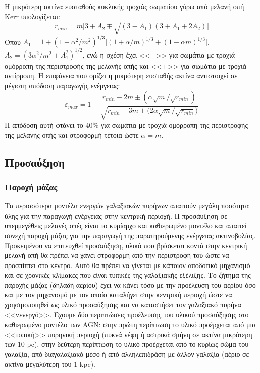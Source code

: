 Η μικρότερη ακτίνα ευσταθούς κυκλικής τροχιάς σωματίου γύρω από μελανή οπή \textlatin{Kerr} υπολογίζεται:
\begin{equation}
r_{min} = m \big[ 3 + A_2 \mp \sqrt{ (3-A_1)(3+A_1+2A_2) } \big]
\end{equation} 
Όπου $A_1 = 1+(1 - \alpha^2 /m^2)^{1/3} \big[ (1+\alpha/m)^{1/3} +(1- \alpha m)^{1/3}  \big]$, $A_2 = (3\alpha^2/m^2 + A_1^2)^{1/2}$, ενώ η σχέση έχει <<$-$>> για σωμάτια με τροχιά ομόρροπη της περιστροφής της μελανής οπής και <<$+$>> για σωμάτια με τροχιά αντίρροπη. 
Η επιφάνεια που ορίζει η μικρότερη ευσταθής ακτίνα αντιστοιχεί σε μέγιστη απόδοση παραγωγής ενέργειας\cite{AccrPower}:
\begin{equation}
\varepsilon_{max} = 1- \dfrac{r_{min} - 2m \pm (\alpha \sqrt{m}/ \sqrt{r_{min}})  } {\sqrt{ r_{min} - 3m \pm \big( 2\alpha \sqrt{m}/ \sqrt{r_{min}}\big)  }}
\end{equation}
Η απόδοση αυτή φτάνει το $40\%$ για σωμάτια με τροχιά ομόρροπη της περιστροφής της μελανής οπής και στροφορμή τέτοια ώστε $\alpha = m$. 

\subsection{Προσαύξηση}

\subsubsection*{Παροχή μάζας}

Τα περισσότερα μοντέλα ενεργών γαλαξιακών πυρήνων απαιτούν μεγάλη ποσότητα ύλης για την παραγωγή ενέργειας στην κεντρική περιοχή. Η προσάυξηση σε υπερμεγέθεις μελανές οπές είναι το κυρίαρχο και καθιερωμένο μοντέλο και απαιτεί συνεχή παροχή μάζας για την παραγωγή της παρατηρούμενης ενέργειας ακτινοβολίας. Προκειμένου να επιτευχθεί προσαύξηση, υλικό που βρίσκεται κοντά στην κεντρική μελανή οπή θα πρέπει να χάνει στροφορμή από την περιστροφή του ώστε να προσπίπτει στο κέντρο. Αυτό θα πρέπει να γίνεται με κάποιον αποδοτικό μηχανισμό και σε χρονικές κλίμακες που είναι τυπικές της γαλαξιακής εξέλιξης\cite{netzer_2013}. Το ζήτημα της παροχής μάζας (δηλαδή αερίου) έχει να κάνει τόσο με την προέλευση του αερίου όσο και με τον μηχανισμό με τον οποίο καταλήγει στην κεντρική περιοχή ώστε να χρησιμοποιηθεί ως υλικό προσαύξησης και να καταστήσει τον γαλαξιακό πυρήνα <<vενεργό>>. Έχουμε δύο περιπτώσεις προέλευσης του υλικού προσαύξησης στο καθιερωμένο μοντέλο των \textlatin{AGN}: στην πρώτη περίπτωση το υλικό προέρχεται από μια <<τοπική>> πυρηνική περιοχή (πυκνά νέφη ή αστρικά σμήνη σε ακτίνα μικρότερη των $10$ \textlatin{pc}), στην δεύτερη περίπτωση το υλικό προέρχεται από το κυρίως σώμα του γαλαξία, από διαγαλαξιακό μέσο ή από αλληλεπιδράση με άλλον γαλαξία (αέριο σε ακτίνα μεγαλύτερη του $1$ \textlatin{kpc})\cite{AccrPower}.

